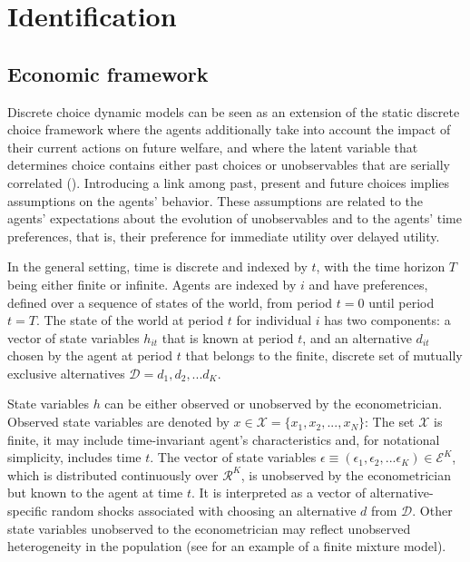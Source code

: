 

\section{Identification} \label{sec:identification}

\subsection{Economic framework}

Discrete choice dynamic models can be seen as an extension of the static discrete choice framework where the agents additionally take into account the impact of their current actions on future welfare, and where the latent variable that determines choice contains either past choices or unobservables that are serially correlated (\cite{KeaneTodd2011}). Introducing a link among past, present and future choices implies assumptions on the agents' behavior. These assumptions are related to the agents' expectations about the evolution of unobservables and to the agents' time preferences, that is, their preference for immediate utility over delayed utility.

In the general setting, time is discrete and indexed by $t$, with the time horizon $T$ being either finite or infinite. Agents are indexed by $i$ and have preferences, defined over a sequence of states of the world, from period $t=0$ until period $t=T$. The state of the world at period $t$ for individual $i$ has two components: a vector of state variables $h_{it}$ that is known at period $t$, and an alternative $d_{it}$ chosen by the agent at period $t$ that belongs to the finite, discrete set of mutually exclusive alternatives $\mathcal{D} = {d_1, d_2, ... d_K}$.

State variables $h$ can be either observed or unobserved by the econometrician. Observed state variables are denoted by $x \in \mathcal{X} = \{x_1, x_2, ..., x_N\}$: The set $\mathcal{X}$ is finite, it may include time-invariant agent's characteristics and, for notational simplicity, includes time $t$. The vector of state variables $\epsilon \equiv (\epsilon_1, \epsilon_2, ... \epsilon_K) \in \mathcal{E}^K$, which is distributed continuously over $\mathcal{R}^K$, is unobserved by the econometrician but known to the agent at time $t$. It is interpreted as a vector of alternative-specific random shocks associated with choosing an alternative $d$ from $\mathcal{D}$. Other state variables unobserved to the econometrician may reflect unobserved heterogeneity in the population (see \textcite{KeaneWolpin1997} for an example of a finite mixture model).

